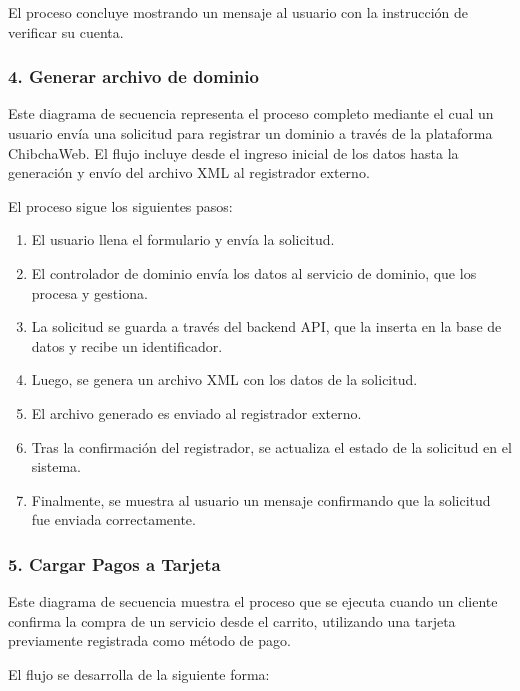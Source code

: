 El proceso concluye mostrando un mensaje al usuario con la instrucción de verificar su cuenta.

\subsubsection*{4. Generar archivo de dominio}

Este diagrama de secuencia representa el proceso completo mediante el cual un usuario envía una solicitud para registrar un dominio a través de la plataforma ChibchaWeb. El flujo incluye desde el ingreso inicial de los datos hasta la generación y envío del archivo XML al registrador externo.

El proceso sigue los siguientes pasos:

\begin{enumerate}
\item El usuario llena el formulario y envía la solicitud.
\item El controlador de dominio envía los datos al servicio de dominio, que los procesa y gestiona.
\item La solicitud se guarda a través del backend API, que la inserta en la base de datos y recibe un identificador.
\item Luego, se genera un archivo XML con los datos de la solicitud.
\item El archivo generado es enviado al registrador externo.
\item Tras la confirmación del registrador, se actualiza el estado de la solicitud en el sistema.
\item Finalmente, se muestra al usuario un mensaje confirmando que la solicitud fue enviada correctamente.
\end{enumerate}

\subsubsection*{5. Cargar Pagos a Tarjeta}
Este diagrama de secuencia muestra el proceso que se ejecuta cuando un cliente confirma la compra de un servicio desde el carrito, utilizando una tarjeta previamente registrada como método de pago.

El flujo se desarrolla de la siguiente forma:

